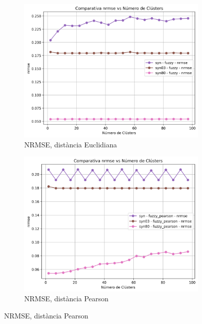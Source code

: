 \documentclass[a4paper,12pt]{report}
\begin{document}
\begin{figure}[H]
    \vspace{1em}

    \begin{subfigure}[b]{0.49\textwidth}
        \includegraphics[width=\textwidth]{Figuras/nrmse-fuzzy-sin.png}
        \caption{NRMSE, distància Euclidiana}
        \label{fig:fuzzy-clustering-sin-results-c}
    \end{subfigure}
    \hfill
    \begin{subfigure}[b]{0.49\textwidth}
        \includegraphics[width=\textwidth]{Figuras/nrmse-fuzzy_pearson-sin.png}
        \caption{NRMSE, distància Pearson}
        \label{fig:fuzzy-clustering-sin-results-d}
    \end{subfigure}


\end{figure}
\end{document}
